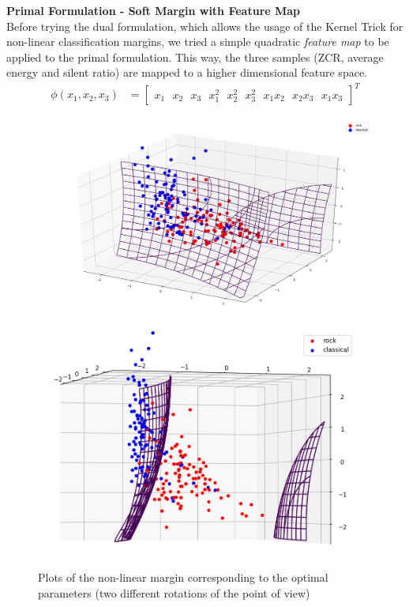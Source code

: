 \documentclass[12pt]{article}
\begin{document}
	\textbf{Primal Formulation - Soft Margin with Feature Map}\\
	Before trying the dual formulation, which allows the usage of the Kernel Trick for non-linear classification margins, we tried a simple quadratic \textit{feature map} to be applied to the primal formulation. This way, the three samples (ZCR, average energy and silent ratio) are mapped to a higher dimensional feature space.
	\begin{align}
		\phi(x_1, x_2, x_3) &= \begin{bmatrix}
			x_1 \ \ \
			x_2 \ \ \
			x_3 \ \ \
			x_1^2 \ \ \
			x_2^2 \ \ \
			x_3^2 \ \ \
			x_1x_2 \ \ \
			x_2x_3 \ \ \
			x_1x_3
		\end{bmatrix} ^T
	\end{align}

	\begin{figure}[H]
		\includegraphics[scale=0.4]{quad_feat}
		\includegraphics[scale=0.4]{quad_feat_side}
		\caption{Plots of the non-linear margin corresponding to the optimal parameters (two different rotations of the point of view)}
	\end{figure} \newpage
	
\end{document}
